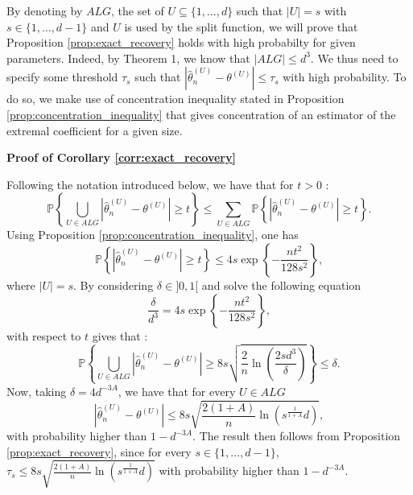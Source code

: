 \documentclass[11pt]{article}
\makeatletter
\renewenvironment{proof}[1][\proofname]{\par
\pushQED{\qed}%
\normalfont \topsep6\p@\@plus6\p@\relax
\trivlist
\item\relax
{\textbf{
#1\@addpunct{ }}}\hspace\labelsep\ignorespaces
}{%
\popQED\endtrivlist\@endpefalse
}
\makeatother
\begin{document}
	By denoting by $ALG$, the set of $U \subseteq \{1,\dots,d\}$ such that $|U| = s$ with $s \in \{1,\dots, d-1\}$ and $U$ is used by the split function, we will prove that Proposition \ref{prop:exact_recovery} holds with high probabilty for given parameters. Indeed, by Theorem 1, we know that $|ALG| \leq d^3$. We thus need to specify some threshold $\tau_s$ such that $|\hat{\theta}_n^{(U)} - \theta^{(U)}| \leq \tau_s$ with high probability. To do so, we make use of concentration inequality stated in Proposition \ref{prop:concentration_inequality} that gives concentration of an estimator of the extremal coefficient for a given size.
	
	\begin{proof}[Proof of Corollary \ref{corr:exact_recovery}]
		Following the notation introduced below, we have that for $t>0$ :
		\begin{equation*}
			\mathbb{P}\left\{ \bigcup_{U \in ALG} |\hat{\theta}_n^{(U)} - \theta^{(U)}| \geq t \right\} \leq \sum_{U \in ALG} \mathbb{P}\left\{|\hat{\theta}_n^{(U)} - \theta^{(U)}| \geq t \right\}.
		\end{equation*}
		Using Proposition \ref{prop:concentration_inequality}, one has 
		\begin{equation*}
			\mathbb{P}\left\{|\hat{\theta}_n^{(U)} - \theta^{(U)}| \geq t \right\} \leq 4 s \exp \left\{-\frac{nt^2}{128 s^2} \right\},
		\end{equation*}
		where $|U| = s$. By considering $\delta \in ]0,1[$ and solve the following equation
		\begin{equation*}
			\frac{\delta}{d^3} = 4 s \exp \left\{-\frac{nt^2}{128 s^2} \right\},
		\end{equation*}
		with respect to $t$ gives that :
		\begin{equation*}
			\mathbb{P}\left\{ \bigcup_{U \in ALG} |\hat{\theta}_n^{(U)} - \theta^{(U)}| \geq 8 s \sqrt{\frac{2}{n} \ln \left( \frac{2s d^3}{\delta} \right)} \right\} \leq \delta.
		\end{equation*}
		Now, taking $\delta = 4d^{-3A}$, we have that for every $U \in ALG$
		\begin{equation*}
			|\hat{\theta}_n^{(U)} - \theta^{(U)}| \leq 8 s \sqrt{\frac{2(1+A)}{n} \ln \left(s^{\frac{1}{1+A}} d \right)},
		\end{equation*}
		with probability higher than $1 - d^{-3A}$. The result then follows from Proposition \ref{prop:exact_recovery}, since for every $s \in \{1, \dots, d-1\}$, $\tau_{s} \leq 8 s \sqrt{\frac{2(1+A)}{n} \ln \left(s^{\frac{1}{1+A}} d \right)}$ with probability higher than $1-d^{-3A}$.
	\end{proof}
	
\end{document}
